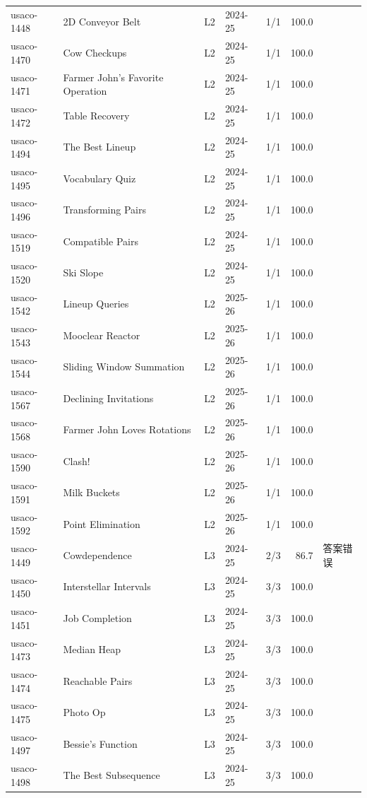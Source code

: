 \documentclass[11pt,a4paper,fontset=none]{ctexart}
\begin{document}
{\begin{longtable}{@{}l>{\raggedright\arraybackslash}p{3.4cm}llrr>{\raggedright\arraybackslash}p{3.1cm}@{}}
usaco-1448 & 2D Conveyor Belt & L2 & 2024-25 & 1/1 & 100.0 &  \\
usaco-1470 & Cow Checkups & L2 & 2024-25 & 1/1 & 100.0 &  \\
usaco-1471 & Farmer John's Favorite Operation & L2 & 2024-25 & 1/1 & 100.0 &  \\
usaco-1472 & Table Recovery & L2 & 2024-25 & 1/1 & 100.0 &  \\
usaco-1494 & The Best Lineup & L2 & 2024-25 & 1/1 & 100.0 &  \\
usaco-1495 & Vocabulary Quiz & L2 & 2024-25 & 1/1 & 100.0 &  \\
usaco-1496 & Transforming Pairs & L2 & 2024-25 & 1/1 & 100.0 &  \\
usaco-1519 & Compatible Pairs & L2 & 2024-25 & 1/1 & 100.0 &  \\
usaco-1520 & Ski Slope & L2 & 2024-25 & 1/1 & 100.0 &  \\
usaco-1542 & Lineup Queries & L2 & 2025-26 & 1/1 & 100.0 &  \\
usaco-1543 & Mooclear Reactor & L2 & 2025-26 & 1/1 & 100.0 &  \\
usaco-1544 & Sliding Window Summation & L2 & 2025-26 & 1/1 & 100.0 &  \\
usaco-1567 & Declining Invitations & L2 & 2025-26 & 1/1 & 100.0 &  \\
usaco-1568 & Farmer John Loves Rotations & L2 & 2025-26 & 1/1 & 100.0 &  \\
usaco-1590 & Clash! & L2 & 2025-26 & 1/1 & 100.0 &  \\
usaco-1591 & Milk Buckets & L2 & 2025-26 & 1/1 & 100.0 &  \\
usaco-1592 & Point Elimination & L2 & 2025-26 & 1/1 & 100.0 &  \\
usaco-1449 & Cowdependence & L3 & 2024-25 & 2/3 & 86.7 & 答案错误 \\
usaco-1450 & Interstellar Intervals & L3 & 2024-25 & 3/3 & 100.0 &  \\
usaco-1451 & Job Completion & L3 & 2024-25 & 3/3 & 100.0 &  \\
usaco-1473 & Median Heap & L3 & 2024-25 & 3/3 & 100.0 &  \\
usaco-1474 & Reachable Pairs & L3 & 2024-25 & 3/3 & 100.0 &  \\
usaco-1475 & Photo Op & L3 & 2024-25 & 3/3 & 100.0 &  \\
usaco-1497 & Bessie's Function & L3 & 2024-25 & 3/3 & 100.0 &  \\
usaco-1498 & The Best Subsequence & L3 & 2024-25 & 3/3 & 100.0 &  \\

\end{longtable}}
\end{document}
